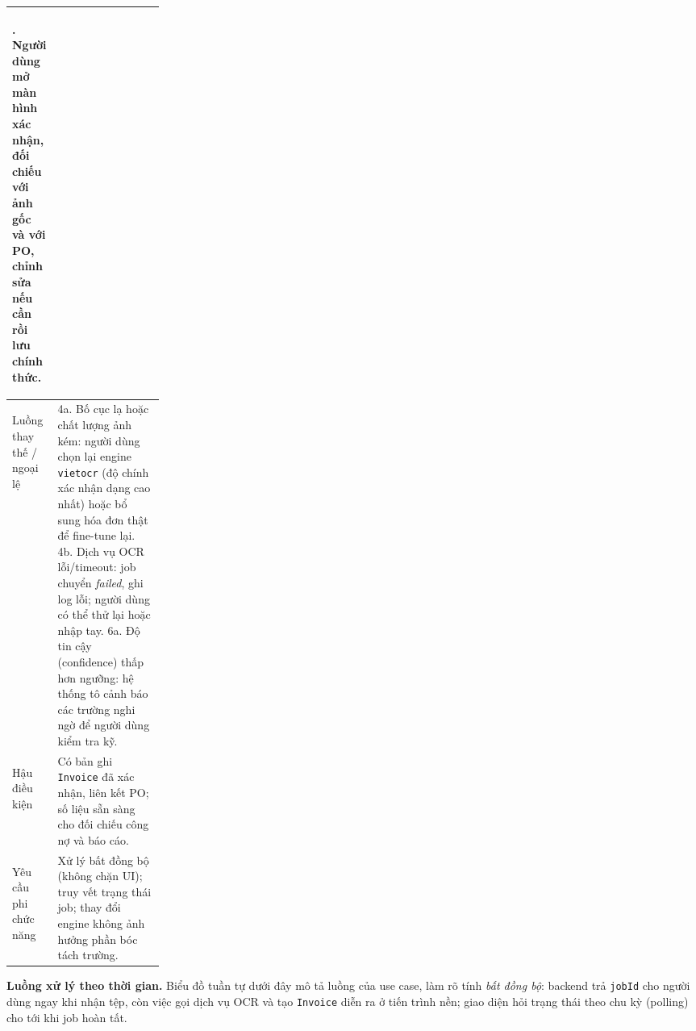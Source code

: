 \begin{table}[H]
\begin{tabularx}{\linewidth}{|>{\bfseries\raggedright\arraybackslash}p{0.22\linewidth}|X|}
6. Người dùng mở màn hình xác nhận, đối chiếu với ảnh gốc và với PO, chỉnh sửa nếu cần rồi lưu chính thức. \\ \hline
Luồng thay thế / ngoại lệ &
4a. Bố cục lạ hoặc chất lượng ảnh kém: người dùng chọn lại engine \texttt{vietocr} (độ chính xác nhận dạng cao nhất) hoặc bổ sung hóa đơn thật để fine-tune lại.\newline
4b. Dịch vụ OCR lỗi/timeout: job chuyển \emph{failed}, ghi log lỗi; người dùng có thể thử lại hoặc nhập tay.\newline
6a. Độ tin cậy (confidence) thấp hơn ngưỡng: hệ thống tô cảnh báo các trường nghi ngờ để người dùng kiểm tra kỹ. \\ \hline
Hậu điều kiện & Có bản ghi \texttt{Invoice} đã xác nhận, liên kết PO; số liệu sẵn sàng cho đối chiếu công nợ và báo cáo. \\ \hline
Yêu cầu phi chức năng & Xử lý bất đồng bộ (không chặn UI); truy vết trạng thái job; thay đổi engine không ảnh hưởng phần bóc tách trường. \\ \hline
\end{tabularx}
\end{table}

\noindent\textbf{Luồng xử lý theo thời gian.} Biểu đồ tuần tự dưới đây mô tả luồng của use case, làm rõ tính \emph{bất đồng bộ}: backend trả \texttt{jobId} cho người dùng ngay khi nhận tệp, còn việc gọi dịch vụ OCR và tạo \texttt{Invoice} diễn ra ở tiến trình nền; giao diện hỏi trạng thái theo chu kỳ (polling) cho tới khi job hoàn tất.

